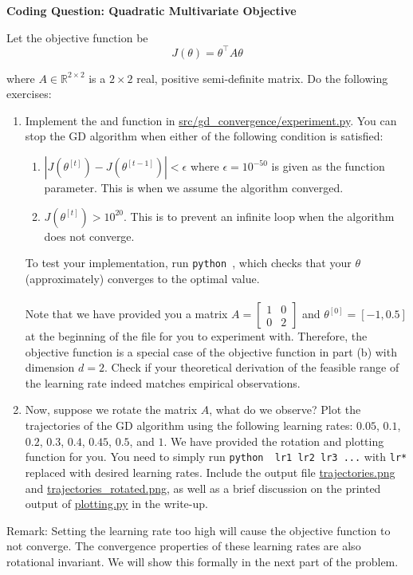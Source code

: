 \item {} {\bf Coding Question: Quadratic Multivariate Objective}

Let the objective function be 
\begin{equation*}
	J(\theta) = \theta^\top A\theta
\end{equation*}

where $A\in\mathbb{R}^{2\times 2}$ is a $2 \times 2$ real, positive semi-definite matrix. Do the following exercises:

\begin{enumerate}
	\item Implement the  and  function in \url{src/gd_convergence/experiment.py}. You can stop the GD algorithm when either of the following condition is satisfied:
	\begin{enumerate}
		\item $|J(\theta^{[t]}) - J(\theta^{[t-1]})| < \epsilon$ where $\epsilon=10^{-50}$ is given as the function parameter. This is when we assume the algorithm converged. 
		\item $J(\theta^{[t]}) > 10^{20}$. This is to prevent an infinite loop when the algorithm does not converge.
	\end{enumerate}
	To test your implementation, run \texttt{python }, which checks that your $\theta$ (approximately) converges to the optimal value. \\
	\\
	Note that we have provided you a matrix $A=\begin{bmatrix} 1 & 0 \\ 0 & 2 \end{bmatrix}$ and $\theta^{[0]} = [-1, 0.5]$ at the beginning of the file for you to experiment with. Therefore, the objective function is a special case of the objective function in part (b) with dimension $d=2$. Check if your theoretical derivation of the feasible range of the learning rate indeed matches empirical observations. 
	\item Now, suppose we rotate the matrix $A$, what do we observe?
	 Plot the trajectories of the GD algorithm using the following learning rates: $0.05$, $0.1$, $0.2$, $0.3$, $0.4$, $0.45$, $0.5$, and $1$. We have provided the rotation and plotting function for you. You need to simply run \texttt{python }\texttt{ lr1 lr2 lr3 ...} with \texttt{lr*} replaced with desired learning rates. Include the output file \url{trajectories.png} and \url{trajectories_rotated.png}, as well as a brief discussion on the printed output of \url{plotting.py} in the write-up.
\end{enumerate}

Remark: Setting the learning rate too high will cause the objective function to not converge. The convergence properties of these learning rates are also rotational invariant. We will show this formally in the next part of the problem.